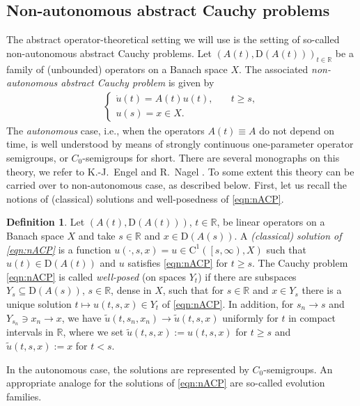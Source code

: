 \documentclass[a4paper,oneside,10pt]{amsart}
\theoremstyle{definition}
\newtheorem{definition}[theorem]{Definition}
\numberwithin{equation}{section}
\def\dom{\mathrm{D}}
\def\RR{\mathbb{R}}
\begin{document}
\subsection{Non-autonomous abstract Cauchy problems}
The abstract operator-theoretical setting we will use is the setting of  so-called  non-autonomous abstract Cauchy problems. Let $(A(t),\dom(A(t)))_{t\in\RR}$ be a family of (unbounded) operators on a Banach space $X$. The associated \emph{non-autonomous abstract Cauchy problem} is given by
\begin{align}\tag{nACP}\label{eqn:nACP}
\begin{cases}
\dot{u}(t)=A(t)u(t),&\quad t\geq s,\\
u(s)=x \in X.
\end{cases}
\end{align}
The \emph{autonomous} case, i.e., when the operators $A(t)\equiv A$ do not depend on time, is well understood by means of strongly continuous one-parameter operator semigroups, or $C_0$-semigroups for short. There are several monographs on this theory, we refer to K.-J.~Engel and R.~Nagel \cite{EN}. 
To some extent this theory can be carried over to non-autonomous case, as described below. First, let us recall the notions of (classical) solutions and well-posedness of \eqref{eqn:nACP}.

\begin{definition}{\cite[Def. VI.9.1]{EN}}
Let $(A(t),\dom(A(t)))$, $t\in\RR$, be linear operators on a Banach space $X$ and take $s\in\RR$ and $x\in\dom(A(s))$. A \emph{(classical) solution of \eqref{eqn:nACP}} is a function $u(\cdot,s,x)=u\in\mathrm{C}^1\left(\left[s,\infty\right),X\right)$ such that $u(t)\in\dom(A(t))$ and $u$ satisfies \eqref{eqn:nACP} for $t\geq s$. The Cauchy problem \eqref{eqn:nACP} is called \emph{well-posed} (on spaces $Y_t$) if there are subspaces $Y_s\subseteq\dom(A(s))$, $s\in\RR$, dense in  $X$, such that for $s\in\RR$ and $x\in Y_s$ there is a unique solution $t\mapsto u(t,s,x)\in Y_t$ of \eqref{eqn:nACP}. In addition, for $s_n\to s$ and $Y_{s_n}\ni x_n\to x$, we have $\widetilde{u}(t,s_n,x_n)\to\widetilde{u}(t,s,x)$ uniformly for $t$ in compact intervals in $\RR$, where we set $\widetilde{u}(t,s,x):={u}(t,s,x)$ for $t\geq s$ and $\widetilde{u}(t,s,x):=x$ for $t<s$.
\end{definition}

In the autonomous case, the solutions are represented by $C_0$-semigroups. An appropriate analoge for the solutions of \eqref{eqn:nACP} are  so-called evolution families.
\end{document}
